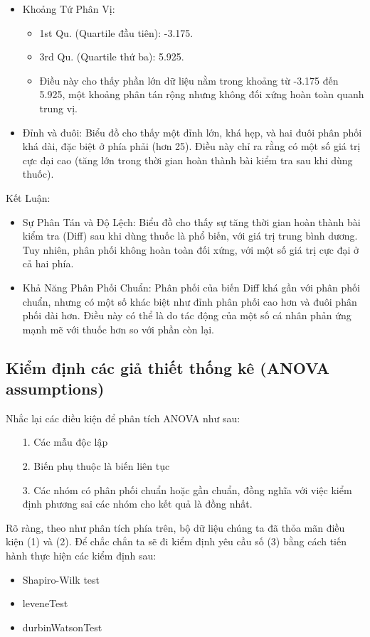 \begin{itemize}
\begin{itemize}
        \item Khoảng Tứ Phân Vị:
        \begin{itemize}
            \item 1st Qu. (Quartile đầu tiên): -3.175.
            \item 3rd Qu. (Quartile thứ ba): 5.925.
            \item Điều này cho thấy phần lớn dữ liệu nằm trong khoảng từ -3.175 đến 5.925, một khoảng phân tán rộng nhưng không đối xứng hoàn toàn quanh trung vị.
        \end{itemize}
        \item  Đỉnh và đuôi: Biểu đồ cho thấy một đỉnh lớn, khá hẹp, và hai đuôi phân phối khá dài, đặc biệt ở phía phải (hơn 25). Điều này chỉ ra rằng có một số giá trị cực đại cao (tăng lớn trong thời gian hoàn thành bài kiểm tra sau khi dùng thuốc).
    \end{itemize}
    \newpage
    Kết Luận:
    \begin{itemize}
        \item Sự Phân Tán và Độ Lệch: Biểu đồ cho thấy sự tăng thời gian hoàn thành bài kiểm tra (Diff) sau khi dùng thuốc là phổ biến, với giá trị trung bình dương. Tuy nhiên, phân phối không hoàn toàn đối xứng, với một số giá trị cực đại ở cả hai phía.
        \item Khả Năng Phân Phối Chuẩn: Phân phối của biến Diff khá gần với phân phối chuẩn, nhưng có một số khác biệt như đỉnh phân phối cao hơn và đuôi phân phối dài hơn. Điều này có thể là do tác động của một số cá nhân phản ứng mạnh mẽ với thuốc hơn so với phần còn lại.
    \end{itemize}
\end{itemize}

\subsection{Kiểm định các giả thiết thống kê (ANOVA assumptions)}
Nhắc lại các điều kiện để phân tích ANOVA như sau:
\begin{itemize}
    \item [1.] Các mẫu độc lập
    \item [2.] Biến phụ thuộc là biến liên tục
    \item [3.] Các nhóm có phân phối chuẩn hoặc gần chuẩn, đồng nghĩa với việc kiểm định phương sai các nhóm cho kết quả là đồng nhất.
\end{itemize}

Rõ ràng, theo như phân tích phía trên, bộ dữ liệu chúng ta đã thỏa mãn điều kiện (1) và (2). Để chắc chắn ta sẽ đi kiểm định yêu cầu số (3) bằng cách tiến hành thực hiện các kiểm định sau:
\begin{itemize}
    \item Shapiro-Wilk test
    \item leveneTest
    \item durbinWatsonTest
\end{itemize}

